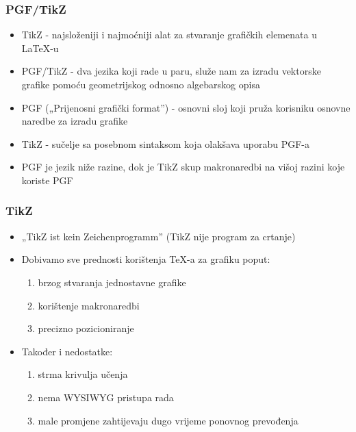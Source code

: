 \documentclass{beamer}
\begin{document}
	\begin{frame}
	\frametitle{PGF/TikZ}
		\begin{itemize}
		\item TikZ - najsloženiji i najmoćniji alat za stvaranje grafičkih elemenata u LaTeX-u
		\item PGF/TikZ - dva jezika koji rade u paru, služe nam za izradu vektorske grafike pomoću geometrijskog odnosno algebarskog opisa
		\item PGF („Prijenosni grafički format”) - osnovni sloj koji pruža korisniku osnovne naredbe za izradu grafike 
  		\item TikZ - sučelje sa posebnom sintaksom koja olakšava uporabu PGF-a
  		\item PGF je jezik niže razine, dok je TikZ skup makronaredbi na višoj razini koje koriste PGF
  		\end{itemize}	
	\end{frame}	

	\begin{frame}
	\frametitle{TikZ}
		\begin{itemize}
		\item „TikZ ist kein Zeichenprogramm” (TikZ nije program za crtanje)
		\item Dobivamo sve prednosti korištenja TeX-a za grafiku poput:
			\begin{enumerate}
			\item brzog stvaranja jednostavne grafike
			\item korištenje makronaredbi
 			\item precizno pozicioniranje
			\end{enumerate}
		\item Također i nedostatke:	
			\begin{enumerate}
			\item strma krivulja učenja
			\item nema WYSIWYG pristupa rada
 			\item male promjene zahtijevaju dugo vrijeme ponovnog prevođenja
			\end{enumerate}
  		\end{itemize}	
	\end{frame}
\end{document}
